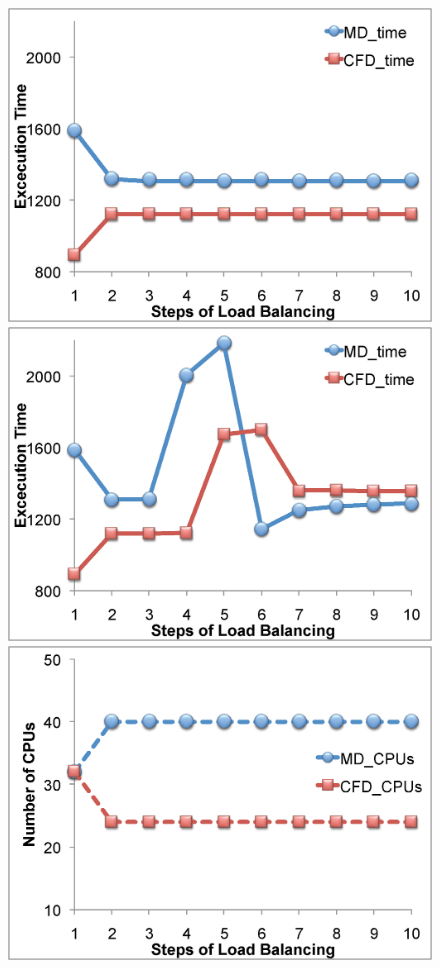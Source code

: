 \documentclass[conference,final]{IEEEtran}
\begin{document}
\begin{figure}
\centering
\includegraphics[scale=0.31]{fig7_11.eps}
\includegraphics[scale=0.31]{fig7_21.eps}
\linebreak
\includegraphics[scale=0.31]{fig7_12.eps}

\end{figure}
\end{document}
